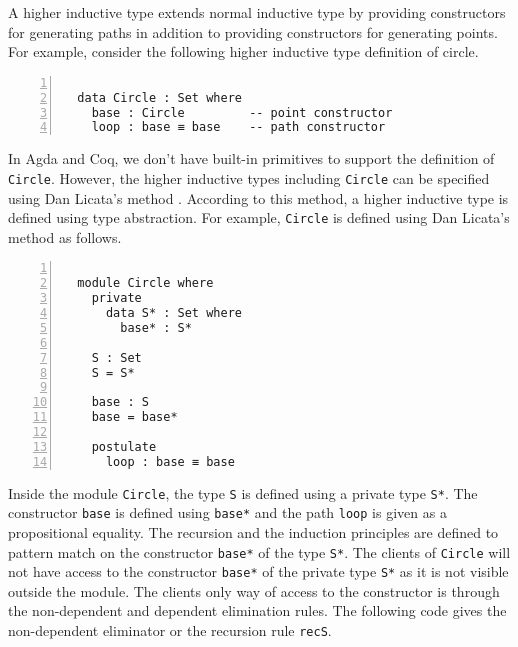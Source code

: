 \documentclass[sigplan,10pt]{acmart}
\begin{document}
A higher inductive type extends normal inductive type by providing constructors for generating paths in addition to providing constructors for generating points. For example, consider the following higher inductive type definition of circle.

\begin{center}
\begingroup
\fontsize{7pt}{9pt}\selectfont
\begin{Verbatim}[frame = lines, rulecolor=\color{blue}, numbers = left, numbersep = 0pt]

  data Circle : Set where
    base : Circle         -- point constructor
    loop : base ≡ base    -- path constructor

\end{Verbatim}
\endgroup
\end{center}

\normalsize

In Agda and Coq, we don't have built-in primitives to support the definition of {\tt Circle}. However, the higher inductive types including {\tt Circle} can be specified using Dan Licata's method \cite{Licata-2011}. According to this method, a higher inductive type is defined using type abstraction. For example, {\tt Circle} is defined using Dan Licata's method as follows. 

\begin{center}
\begingroup
\fontsize{7pt}{9pt}\selectfont
\begin{Verbatim}[frame = lines, rulecolor=\color{blue}, numbers = left, numbersep = 0pt]

  module Circle where
    private
      data S* : Set where
        base* : S*

    S : Set
    S = S*

    base : S
    base = base*
	   
    postulate
      loop : base ≡ base

\end{Verbatim}
\endgroup
\end{center}

\normalsize

Inside the module {\tt Circle}, the type {\tt S} is defined using a private type {\tt S*}. The constructor {\tt base} is defined using {\tt base*} and the path {\tt loop} is given as a propositional equality. The recursion and the induction principles are defined to pattern match on the constructor {\tt base*} of the type {\tt S*}. The clients of {\tt Circle} will not have access to the constructor {\tt base*} of the private type {\tt S*} as it is not visible outside the module. The clients only way of access to the constructor is through the non-dependent and dependent elimination rules. The following code gives the non-dependent eliminator or the recursion rule {\tt recS}. 
\end{document}
